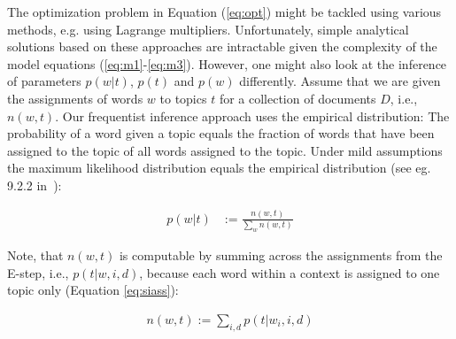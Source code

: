 \documentclass[twocolumn,10]{article}
\newcommand{\ci}{~\cite} \newcommand{\re}{~\ref} \newcommand{\ma}{\mathbb}
\begin{document}
The optimization problem in Equation (\ref{eq:opt}) might be tackled using various methods, e.g. using Lagrange multipliers. Unfortunately, simple analytical solutions based on these approaches are intractable given the complexity of the model equations (\ref{eq:m1}-\ref{eq:m3}). However, one might also look at the inference of parameters $p(w|t)$, $p(t)$ and $p(w)$ differently. Assume that we are given the assignments of words $w$ to topics $t$ for a collection of documents $D$, i.e., $n(w,t)$. Our frequentist inference approach uses the empirical distribution: The probability of a word given a topic equals the fraction of words that have been assigned to the topic of all words assigned to the topic. Under mild assumptions the maximum likelihood distribution equals the empirical distribution (see eg. 9.2.2 in\ci{bar12}): %
			\vspace{-5pt}
	\begin{small}
		\begin{equation}	
		\begin{aligned}	
		p(w|t)&:= \frac{n(w,t)}{\sum_{w} n(w,t)}		
		\end{aligned}   \end{equation} 
	\end{small}	
		Note, that $n(w,t)$ is computable by summing across the assignments from the E-step, i.e., $p(t|w,i,d)$, because each word within a context is assigned to one topic only (Equation \ref{eq:siass}):
		\begin{small}
			\begin{equation}	
			\begin{aligned}	%
			n(w,t):= \sum_{i,d} p(t|w_i,i,d)
			\end{aligned}   \end{equation} 
		\end{small}
\end{document}

